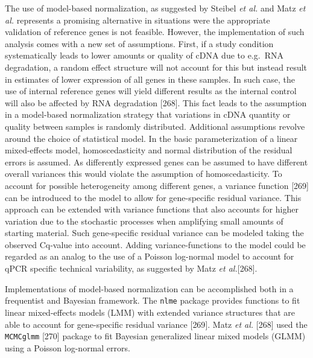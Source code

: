 \documentclass[twoside,10pt]{gihclass} %
\begin{document}
The use of model-based normalization, as suggested by Steibel \emph{et al.} and Matz \emph{et al.} represents a promising alternative in situations were the appropriate validation of reference genes is not feasible.
However, the implementation of such analysis comes with a new set of assumptions.
First, if a study condition systematically leads to lower amounts or quality of cDNA due to e.g.~RNA degradation, a random effect structure will not account for this but instead result in estimates of lower expression of all genes in these samples. In such case, the use of internal reference genes will yield different results as the internal control will also be affected by RNA degradation
{[}268{]}.
This fact leads to the assumption in a model-based normalization strategy that variations in cDNA quantity or quality between samples is randomly distributed.
Additional assumptions revolve around the choice of statistical model.
In the basic parameterization of a linear mixed-effects model, homoscedasticity and normal distribution of the residual errors is assumed.
As differently expressed genes can be assumed to have different overall variances this would violate the assumption of homoscedasticity. To account for possible heterogeneity among different genes, a variance function
{[}269{]}
can be introduced to the model to allow for gene-specific residual variance. This approach can be extended with variance functions that also accounts for higher variation due to the stochastic processes when amplifying small amounts of starting material.
Such gene-specific residual variance can be modeled taking the observed Cq-value into account.
Adding variance-functions to the model could be regarded as an analog to the use of a Poisson log-normal model to account for qPCR specific technical variability, as suggested by Matz \emph{et al.}{[}268{]}.

Implementations of model-based normalization can be accomplished both in a frequentist and Bayesian framework.
The \texttt{nlme} package provides functions to fit linear mixed-effects models (LMM) with extended variance structures that are able to account for gene-specific residual variance {[}269{]}.
Matz \emph{et al.} {[}268{]} used the \texttt{MCMCglmm} {[}270{]} package to fit Bayesian generalized linear mixed models (GLMM) using a Poisson log-normal errors.
\end{document}
